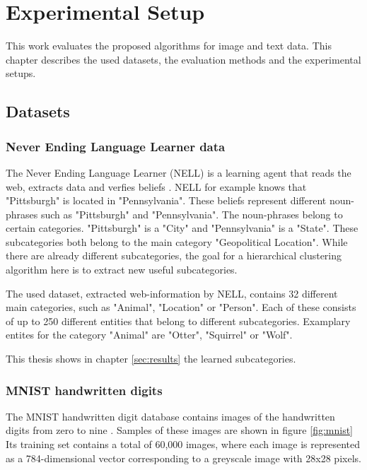 \chapter{Experimental Setup}

This work evaluates the proposed algorithms for image and text data. This chapter describes the used datasets, the evaluation methods and the experimental setups.

\section{Datasets}
\label{sec:datasets}

\subsection{Never Ending Language Learner data}

The Never Ending Language Learner (NELL) is a learning agent that reads the web, extracts data and verfies beliefs \cite{Mitchell:2015:NL:2886521.2886641}\cite{Mitchell:2018:NL:3210350.3191513}. NELL for example knows that "Pittsburgh" is located in "Pennsylvania". These beliefs represent different noun-phrases such as "Pittsburgh" and "Pennsylvania". The noun-phrases belong to certain categories. "Pittsburgh" is a "City" and "Pennsylvania" is a "State". These subcategories both belong to the main category "Geopolitical Location". While there are already different subcategories, the goal for a hierarchical clustering algorithm here is to extract new useful subcategories.

The used dataset, extracted web-information by NELL, contains 32 different main categories, such as "Animal", "Location" or "Person". Each of these consists of up to 250 different entities that belong to different subcategories. Examplary entites for the category "Animal" are "Otter", "Squirrel" or "Wolf". 

This thesis shows in chapter \ref{sec:results} the learned subcategories.

\subsection{MNIST handwritten digits}

The MNIST handwritten digit database contains images of the handwritten digits from zero to nine \cite{lecun-mnisthandwrittendigit-2010}. Samples of these images are shown in figure \ref{fig:mnist} Its training set contains a total of 60,000 images, where each image is represented as a 784-dimensional vector corresponding to a greyscale image with 28x28 pixels.

